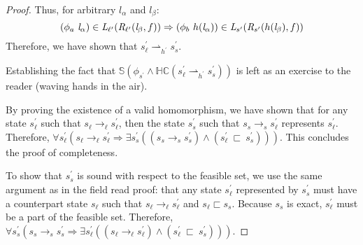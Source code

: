 \begin{proof}
Thus, for arbitrary $l_\alpha$ and $l_\beta$:
$$(\phi_a\ \emph{l}_\alpha) \in \emph{L}_{\ell^\prime}(\emph{R}_{\ell^\prime}(\emph{l}_\beta,f )) \Rightarrow (\phi_b\ h(\emph{l}_\alpha))\in \emph{L}_{s^\prime}(\emph{R}_{s^\prime} (h(\emph{l}_\beta),f ))$$
Therefore, we have shown that $s_\ell^\prime \rightharpoonup_{h^\prime} s_s^\prime$.

Establishing the fact that $\mathbb{S}(\phi_{s^\prime} \wedge \mathbb{HC}(s_\ell^\prime \rightharpoonup_{h^\prime} s_s^\prime) )$ is left as an exercise to the reader (waving hands in the air).

By proving the existence of a valid homomorphism, we have shown that for any state $s_\ell^\prime$ such that $s_\ell \rightarrow_\ell s_\ell^\prime$, then the state $s_s^\prime$ such that $s_s \rightarrow_s s_\ell^\prime$ represents $s_\ell^\prime$. Therefore, $\forall s_\ell^\prime ( s_\ell \rightarrow_\ell s_\ell^\prime \Rightarrow \exists s_s^\prime( (s_s \rightarrow_s s_s^\prime )\wedge (s_\ell^\prime\ \sqsubset\ s_s^\prime ))  )$. This concludes the proof of completeness.

To show that $s_s^\prime$ is sound with respect to the feasible set, we use the same argument as in the field read proof: that any state $s_\ell^\prime$ represented by $s_s^\prime$ must have a counterpart state $s_\ell$ such that $s_\ell \rightarrow_\ell s_\ell^\prime$ and $s_\ell \sqsubset s_s$. Because $s_s$ is exact, $s_\ell^\prime$ must be a part of the feasible set. Therefore, $\forall s_s^\prime ( s_s \rightarrow_s s_s^\prime\Rightarrow \exists s_\ell^\prime( (s_\ell \rightarrow_\ell s_\ell^\prime )\wedge (s_\ell^\prime\ \sqsubset\ s_s^\prime ))  )$.

\end{proof}


